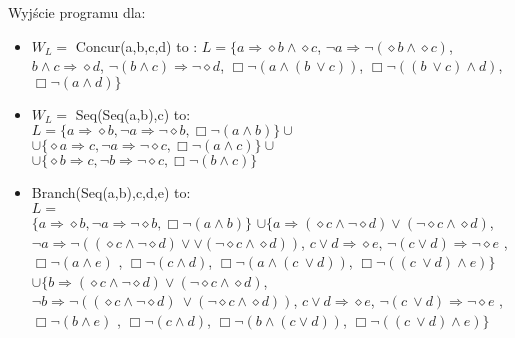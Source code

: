 \documentclass[a4paper, 11pt]{article}
\begin{document}
	Wyjście programu dla:
	\begin{itemize}
	\item $W_L= $ Concur(a,b,c,d) to :
	$L= \{ a   \Rightarrow     \diamond b   \wedge    \diamond c $,
		$	  \neg a   \Rightarrow     \neg (  \diamond b   \wedge    \diamond c)$,
			$ b   \wedge   c    \Rightarrow    \diamond d$,
			$  \neg (b   \wedge   c)    \Rightarrow     \neg   \diamond d$,
			$  \Box   \neg (a   \wedge   (b \  \vee   c))$,
			$  \Box   \neg ((b \  \vee   c)   \wedge   d)$,
			$  \Box   \neg (a   \wedge   d)\}$
	
	\item 	$W_L=$ Seq(Seq(a,b),c) to: \\
	$ L=\{  a \Rightarrow \diamond b , \neg a\Rightarrow \neg \diamond b, \Box \neg (a \wedge  b)\} \cup $ \\
	$ \cup \{\diamond a \Rightarrow c , \neg a\Rightarrow \neg \diamond c, \Box\neg (a \wedge  c)\} \cup $\\
	$ \cup \{\diamond b \Rightarrow c , \neg b\Rightarrow \neg \diamond c, \Box \neg (b \wedge  c)\} $
	
	\item Branch(Seq(a,b),c,d,e) to:\\
	$ L=$\\$ \{  a \Rightarrow \diamond b , \neg a\Rightarrow \neg \diamond b, \Box \neg (a \wedge  b)\} $ 
	$\cup 	\{	  a    \Rightarrow    ( \diamond c   \wedge    \neg   \diamond d)   \vee   ( \neg   \diamond c   \wedge    \diamond d)$,
			  $ \neg a    \Rightarrow     \neg (( \diamond c   \wedge    \neg   \diamond d)  \vee  \vee ( \neg   \diamond c   \wedge    \diamond d))$,
			 $ c  \vee d    \Rightarrow     \diamond e $,
			  $ \neg (c  \vee   d)    \Rightarrow    \neg   \diamond e$ ,
			   $\Box   \neg (a   \wedge   e)$ ,
			   $\Box   \neg (c   \wedge   d)$,
			   $\Box   \neg (a   \wedge   (c \  \vee   d))$,
			   $\Box   \neg ((c \  \vee   d)   \wedge   e)\} $			  
	$\cup 	\{	  b    \Rightarrow    ( \diamond c   \wedge    \neg   \diamond d)   \vee   ( \neg   \diamond c   \wedge    \diamond d)$,
			  $ \neg b    \Rightarrow     \neg (( \diamond c   \wedge    \neg   \diamond d) \  \vee   ( \neg   \diamond c   \wedge    \diamond d))$,
			 $ c  \vee   d    \Rightarrow     \diamond e $,
			  $ \neg (c \  \vee   d)    \Rightarrow    \neg   \diamond e$ ,
			   $\Box   \neg (b   \wedge   e)$ ,
			   $\Box   \neg (c   \wedge   d)$,
			   $\Box   \neg (b   \wedge   (c   \vee   d))$,
			   $\Box   \neg ((c \  \vee   d)   \wedge   e)\}$
			 		   		
	\end{itemize}
	
\end{document}
